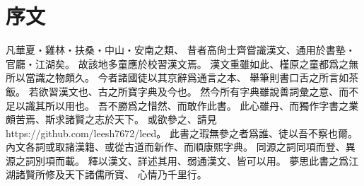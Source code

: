 \chapter*{序文}
凡華夏・雞林・扶桑・中山・安南之類、
昔者高尙士齊嘗識漢文、通用於書塾・官廳・江湖矣。
故該地多童應於校習漢文焉。
漢文重雖如此、槿原之童都爲之無所以當識之物頗久。
今者諸國徒以其京辭爲通言之本、
舉筆則書口舌之所言如茶飯。
若欲習漢文也、古之所寶字典及今也。
然今所有字典雖說善詞彙之意、而不足以識其所以用也。
吾不勝爲之惜然、而敢作此書。
此心雖丹、而獨作字書之業頗苦焉、斯求諸賢之志於天下。
或欲參之、請見 https://github.com/leesh7672/leed。
此書之瑕無參之者爲誰、徒以吾不察也爾。
內文各詞或取諸漢籍、或從古道而新作、而順康熙字典。
同源之詞同項而登、異源之詞別項而載。
釋以漢文、詳述其用、弱通漢文、皆可以用。
夢思此書之爲江湖諸賢所修及天下諸儒所寶、
心情乃千里行。

